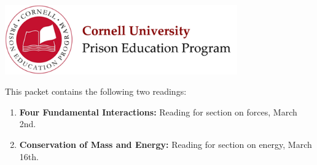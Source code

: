 \documentclass[addpoints,12pt]{exam}
\begin{document}
\begin{center}
\includegraphics[width=10cm]{../images/logo.png}
\end{center}

\begin{center}
\end{center}
\vspace{0.3in}

\noindent This packet contains the following two readings:
\begin{enumerate}
	\item \textbf{Four Fundamental Interactions:} Reading for section on forces, March 2nd.
	\item \textbf{Conservation of Mass and Energy:} Reading for section on energy, March 16th.
\end{enumerate}
\end{document}
